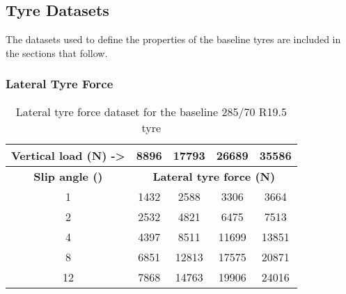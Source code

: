 
\subsection{Tyre Datasets}\label{section:baseline-tyre-datasets}

The datasets used to define the properties of the baseline tyres are included in the sections that follow.

\subsubsection{Lateral Tyre Force}\label{section:lateral-tyre-force-trucksim-datasets}


\begin{table}[H]
	\centering\footnotesize
	\caption{Lateral tyre force dataset for the baseline 285/70 R19.5 tyre}
	\begin{tabular}{|c|c|c|c|c|}
		\hline
		\textbf{Vertical load (N) ->} & 8896 & 17793 & 26689 & 35586 \bigstrut \\
		\hline
		\textbf{Slip angle (\degree{})} & \multicolumn{4}{c|}{\textbf{Lateral tyre force (N)}} \bigstrut\\
		\hline
		1                             & 1432 & 2588  & 3306  & 3664 \bigstrut  \\
		\hline
		2                             & 2532 & 4821  & 6475  & 7513 \bigstrut  \\
		\hline
		4                             & 4397 & 8511  & 11699 & 13851 \bigstrut \\
		\hline
		8                             & 6851 & 12813 & 17575 & 20871 \bigstrut \\
		\hline
		12                            & 7868 & 14763 & 19906 & 24016 \bigstrut \\
		\hline
	\end{tabular}%
	\label{table:baseline-lateral-tyre-force-dataset-285-70-22.5}%
\end{table}%


